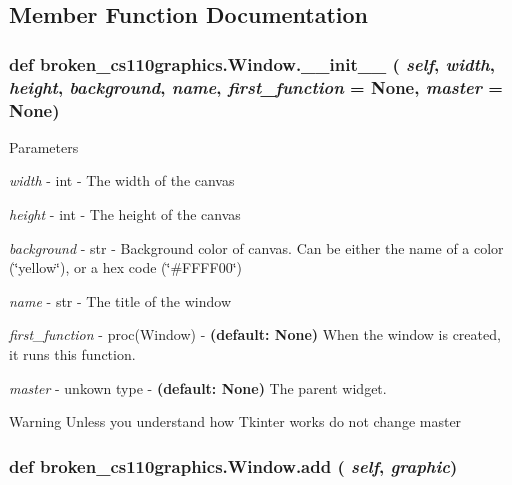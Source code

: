 \subsection{Member Function Documentation}
\hypertarget{classbroken__cs110graphics_1_1Window_a7578fe4d1852c432b923521c8884d40a}{
\subsubsection[{\_\-\_\-init\_\-\_\-}]{\setlength{\rightskip}{0pt plus 5cm}def broken\_\-cs110graphics.Window.\_\-\_\-init\_\-\_\- ( {\em self}, \/   {\em width}, \/   {\em height}, \/   {\em background}, \/   {\em name}, \/   {\em first\_\-function} = {\ttfamily None}, \/   {\em master} = {\ttfamily None})}}
\label{classbroken__cs110graphics_1_1Window_a7578fe4d1852c432b923521c8884d40a}

\begin{DoxyParams}{Parameters}
\item[{\em width}]-\/ int -\/ The width of the canvas \item[{\em height}]-\/ int -\/ The height of the canvas \item[{\em background}]-\/ str -\/ Background color of canvas. Can be either the name of a color (\char`\"{}yellow\char`\"{}), or a hex code (\char`\"{}\#FFFF00\char`\"{}) \item[{\em name}]-\/ str -\/ The title of the window \item[{\em first\_\-function}]-\/ proc(Window) -\/ {\bfseries (default: None)} When the window is created, it runs this function. \item[{\em master}]-\/ unkown type -\/ {\bfseries (default: None)} The parent widget. \end{DoxyParams}
\begin{DoxyWarning}{Warning}
Unless you understand how Tkinter works do not change master 
\end{DoxyWarning}
\hypertarget{classbroken__cs110graphics_1_1Window_a92dfe6c1d31614011e1f74527bb06c34}{
\subsubsection[{add}]{\setlength{\rightskip}{0pt plus 5cm}def broken\_\-cs110graphics.Window.add ( {\em self}, \/   {\em graphic})}}
\label{classbroken__cs110graphics_1_1Window_a92dfe6c1d31614011e1f74527bb06c34}


